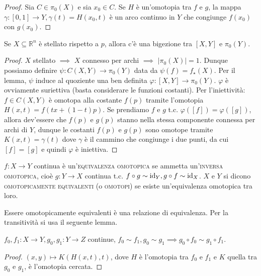 \begin{proof}
  Sia $C \in \pi_0(X)$ e sia $x_0 \in C$. Se $H$ è un'omotopia tra $f$ e $g$, la mappa $\gamma:[0, 1] \rightarrow Y, \gamma(t)=H(x_0, t)$ è un arco continuo in $Y$ che congiunge $f(x_0)$ con $g(x_0)$.
\end{proof}

\begin{ftt}
  Se $X \subseteq \mathbb{R}^n$ è stellato rispetto a $p$, allora c'è una bigezione tra $[X, Y]$ e $\pi_0(Y)$.
\end{ftt}

\begin{proof}
  $X$ stellato $\implies$ $X$ connesso per archi $\implies$ $|\pi_0(X)|=1$. Dunque possiamo definire $\psi:C(X, Y) \rightarrow \pi_0(Y)$ data da $\psi(f)=f_{\star}(X)$. Per il lemma, $\psi$ induce al quoziente una ben definita $\varphi:[X, Y] \rightarrow \pi_0(Y)$. $\varphi$ è ovviamente suriettiva (basta considerare le funzioni costanti). Per l'iniettività: $f \in C(X, Y)$ è omotopa alla costante $f(p)$ tramite l'omotopia $H(x, t)=f(tx+(1-t)p)$.
  Se prendiamo $f$ e $g$ t.c. $\varphi([f])=\varphi([g])$, allora dev'essere che $f(p)$ e $g(p)$ stanno nella stessa componente connessa per archi di $Y$, dunque le costanti $f(p)$ e $g(p)$ sono omotope tramite $K(x, t)=\gamma(t)$ dove $\gamma$ è il cammino che congiunge i due punti, da cui $[f]=[g]$ e quindi $\varphi$ è iniettiva.
\end{proof}

\begin{defn}
  $f:X \rightarrow Y$ continua è un'\textsc{equivalenza omotopica} se ammetta un'\textsc{inversa omotopica}, cioè $g:Y \rightarrow X$ continua t.c. $f \circ g \sim \operatorname{id}_Y, g \circ f \sim \operatorname{id}_X$. $X$ e $Y$ si dicono \textsc{omotopicamente equivalenti} (o \textsc{omotopi}) se esiste un'equivalenza omotopica tra loro.
\end{defn}

\begin{exc}
  Essere omotopicamente equivalenti è una relazione di equivalenza. Per la transitività si usa il seguente lemma.
\end{exc}

\begin{lm}
  $f_0, f_1:X \rightarrow Y, g_0, g_1:Y \rightarrow Z$ continue, $f_0 \sim f_1, g_0 \sim g_1 \implies g_0 \circ f_0 \sim g_1 \circ f_1$.
\end{lm}

\begin{proof}
  $(x, y) \mapsto K(H(x, t), t)$, dove $H$ è l'omotopia tra $f_0$ e $f_1$ e $K$ quella tra $g_0$ e $g_1$, è l'omotopia cercata.
\end{proof}

